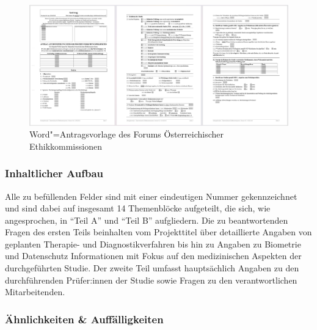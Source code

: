 \documentclass[a4paper,12pt,twoside]{scrreprt}
\begin{document}
\begin{figure}[ht]
    \centering
    \includegraphics[scale=0.21]{thesis/images/Luidold_Word-Vorlage-Forum-Oesterreichischer-Ethikkommissionen.png}
    \caption[Word"=Antragsvorlage des Forums Österreichischer Ethikkommissionen]{Word"=Antragsvorlage des Forums Österreichischer Ethikkommissionen \cite{ethikkommission_der_medizinischen_universitat_graz_download_2012}}
    \label{fig:dokumentenvorlage-föe}
\end{figure}

\subsubsection*{Inhaltlicher Aufbau}
\label{sub-sub-sec:föe-inhaltlicher-aufbau}

Alle zu befüllenden Felder sind mit einer eindeutigen Nummer gekennzeichnet und sind dabei auf insgesamt 14 Themenblöcke aufgeteilt, die sich, wie angesprochen, in \enquote{Teil A} und \enquote{Teil B} aufgliedern. Die zu beantwortenden Fragen des ersten Teils beinhalten vom Projekttitel über detaillierte Angaben von geplanten Therapie- und Diagnostikverfahren bis hin zu Angaben zu Biometrie und Datenschutz Informationen mit Fokus auf den medizinischen Aspekten der durchgeführten Studie. Der zweite Teil umfasst hauptsächlich Angaben zu den durchführenden Prüfer:innen der Studie sowie Fragen zu den verantwortlichen Mitarbeitenden.

\subsubsection*{Ähnlichkeiten \& Auffälligkeiten}
\label{sub-sub-sec:ähnlichkeiten-auffälligkeiten-föe}
\end{document}
